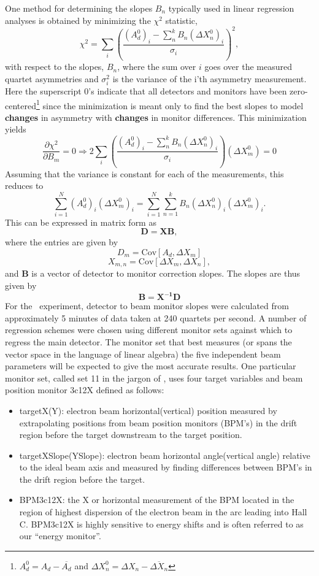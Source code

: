 One method for determining the slopes $B_n$ typically used in linear regression analyses is obtained by minimizing the $\chi^2$ statistic,
\begin{equation}
\chi^2=\sum_{i}\left(\frac{(A_{d}^0)_i- \sum_n^k B_n(\Delta X_n^0)_i}{\sigma_i}\right)^2,
\label{eq:lin_reg_chi_sqare}
\end{equation} 
with respect to the slopes, $B_n$, where the sum over $i$ goes over the measured quartet asymmetries and $\sigma_i^2$ is the variance of the i'th asymmetry measurement. Here the superscript 0's indicate that all detectors and monitors have been zero-centered\footnote{ $A_d^0=A_d-\overline{A_d}$ and $\Delta X_n^0=\Delta X_n-\overline{\Delta X_n}$} since the minimization is meant only to find the best slopes to model {\bf changes} in asymmetry with {\bf changes} in monitor differences. This minimization yields
\[
\frac{\partial \chi^2}{\partial B_m}=0\Longrightarrow2\sum_{i}\left(\frac{(A_{d}^0)_i-\sum_n^k B_n(\Delta X_n^0)_i}{\sigma_i}\right)\left(\Delta X_m^0\right)=0
\]
Assuming that the variance is constant for each of the  measurements, this reduces to 
\begin{equation}
\sum_{i=1}^N(A_{d}^0)_i\left(\Delta X_m^0\right)_i=\sum_{i=1}^N\sum_{n=1}^kB_n\left(\Delta X_n^0\right)_i\left(\Delta X_m^0\right)_i.
\label{eg:lin_matrix_equation}
\end{equation}
This can be expressed in matrix form as 
\[
{\mathbf D} = \mathbf{XB},
\]
where the entries are given by
\[
D_{m}=\mathrm{Cov}[A_{d},\Delta X_m]
\]
\[
X_{m,n}=\mathrm{Cov}[\Delta X_m,\Delta X_n],
\]
and $\mathbf{B}$ is a vector of detector to monitor correction slopes. The slopes are thus given by
\begin{equation}
\mathbf{B}=\mathbf{X^{-1}D}
\label{eq:lin_reg_slopes}
\end{equation}
For the \Q~experiment, detector to beam monitor slopes were calculated from approximately 5 minutes of data taken at 240 quartets per second. A number of regression schemes were chosen using different monitor sets against which to regress the main detector. The monitor set that best measures (or spans the vector space in the language of linear algebra) the five independent beam parameters will be expected to give the most accurate results. One particular monitor set, called set 11 in the jargon of \Q, uses four target variables and beam position monitor 3c12X defined as follows:\\
\begin{itemize}
\item {targetX(Y): electron beam horizontal(vertical) position measured by extrapolating positions from beam position monitors (BPM's) in the drift region before the target downstream to the target position.}
\item {targetXSlope(YSlope): electron beam horizontal angle(vertical angle) relative to the ideal beam axis and measured by finding differences between BPM's in the drift region before the target.}
\item{BPM3c12X: the X or horizontal measurement of the BPM located in the region of highest dispersion of the electron beam in the arc leading into Hall C. BPM3c12X is highly sensitive to energy shifts and is often referred to as our ``energy monitor''.}
\end{itemize}
